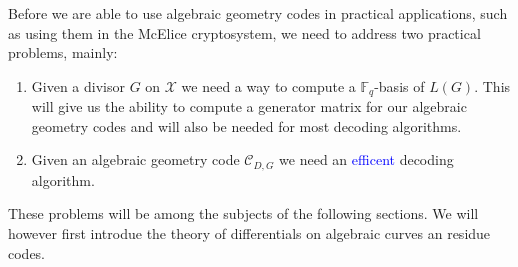 Before we are able to use algebraic geometry codes in practical applications, such as using them in the McElice cryptosystem, we need to address two practical problems, mainly:
\begin{enumerate}
  \item Given a divisor $G$ on $\mathcal{X}$ we need a way to compute a $\mathbb{F}_q$-basis of $L(G)$. This will give us the ability to compute a generator matrix for our algebraic geometry codes and will also be needed for most decoding algorithms.
  \item Given an algebraic geometry code $\mathcal{C}_{D, G}$ we need an \textcolor{blue}{efficent} decoding algorithm.
\end{enumerate}
These problems will be among the subjects of the following sections. We will however first introdue the theory of differentials on algebraic curves an residue codes.


%



